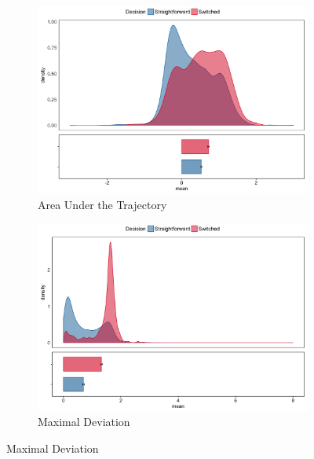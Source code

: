 \documentclass[11pt]{article}
\begin{document}
\begin{figure}
\centering
\begin{subfigure}[b]{0.4\textwidth}
\includegraphics[width=\textwidth]{AUC_calibration.png}
\caption{Area Under the Trajectory}
\end{subfigure}
%
\begin{subfigure}[b]{0.4\textwidth}
\includegraphics[width=\textwidth]{MD_calibration.png}
\caption{Maximal Deviation}
\end{subfigure}


\end{figure}
\end{document}
